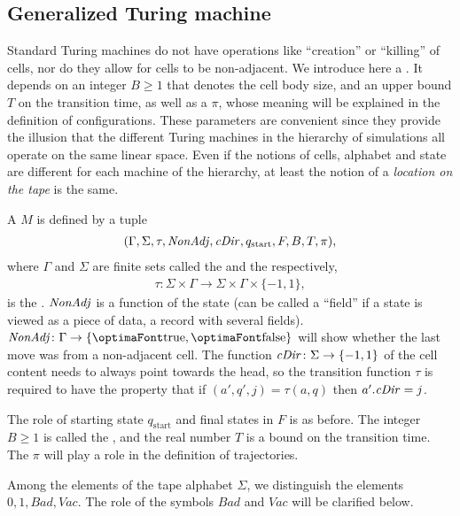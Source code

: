 \documentclass[12pt]{memoir}
\renewcommand{\ge}{\geq}
\newcommand{\fld}[1]{\ensuremath{\textit{#1\/}}}
\def\B{B}
\newcommand{\Bad}{\mathit{Bad}}
\newcommand{\Vacant}{\mathit{Vac}}
\newcommand{\Tu}{T}
\newcommand{\cDir}{\fld{cDir}}
\newcommand{\NonAdj}{\fld{NonAdj}}
\newcommand{\start}{\mathrm{start}}
\begin{document}
\subsection{Generalized Turing machine}

Standard Turing machines do not have
operations like ``creation'' or ``killing'' of cells, nor
do they allow for cells to be non-adjacent.
We introduce here a .
It depends on an integer \( \B \ge 1 \) that denotes the cell body size,
and an upper bound \( \Tu \) on the transition time, as well as a  \( \pi \),
whose meaning will be explained in the definition of configurations.
These parameters are convenient since they provide the illusion that the different Turing
machines in the hierarchy of simulations all operate on the same linear space.
Even if the notions of cells, alphabet
and state are different for each machine of the hierarchy, 
at least the notion of a \emph{location on the tape} is the same.


\begin{definition}\label{def:gen-TM}
    A  \( M \) is defined by a tuple
        \begin{align}\label{eq:gen-TM}
             (\Gamma, \Sigma, \tau, \NonAdj, \cDir, q_{\start},F, \B, \Tu, \pi),
       \end{align}
    where \( \Gamma \) and \( \Sigma \) are finite sets
    called the  and the  respectively,
        \begin{align*}
             \tau: \Sigma\times \Gamma
             \to \Sigma\times \Gamma\times\{-1,1\},
        \end{align*}
    is the .
\( \NonAdj \) is a function of the state (can be called a ``field'' if a state is viewed 
as a piece of data, a record with several fields).
\( \NonAdj\colon\Gamma\to\{\true,\false\} \) will show 
whether the last move was from a non-adjacent cell.
The function \( \cDir\colon\Sigma\to\{-1,1\} \) of the cell content
needs to always point towards the head, so 
the transition function \( \tau \) is required to have the property that
if \( (a',q',j)=\tau(a,q) \) then \( a'.\cDir=j \).

The role of starting state \( q_{\start} \) and final states in \( F \) is as before.
The integer \( \B\ge 1 \) is called the ,
and the real number \( \Tu \) is a bound on the transition time.
The  \( \pi \) will play a role in the definition of trajectories.

Among the elements of the tape alphabet \( \Sigma \), 
we distinguish the elements \( 0,1,\Bad,\Vacant \).
The role of the symbols \( \Bad \) and \( \Vacant \) will be clarified below.
\end{definition}
\end{document}

